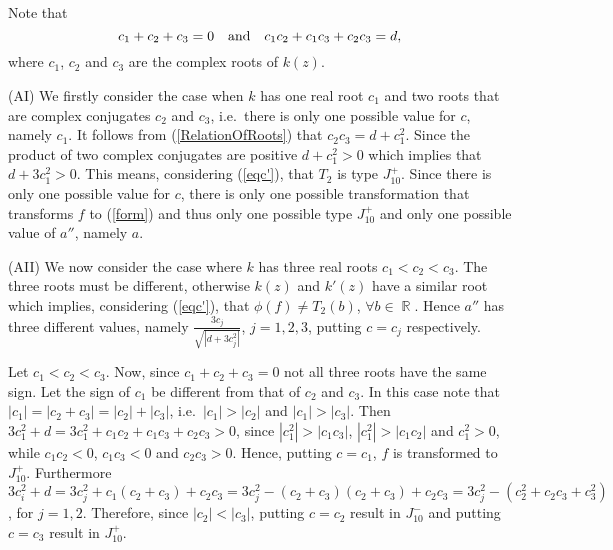 \documentclass[noend]{amsproc}
\theoremstyle{definition}
\DeclareMathOperator{\R}{\mathbb{R}}
\begin{document}
Note that
\begin{equation}\label{RelationOfRoots}
c_1+c_2+c_3=0\quad\textnormal{and}\quad c_1c_2+c_1c_3+c_2c_3=d,
\end{equation}
where $c_1$, $c_2$ and $c_3$ are the complex roots of $k(z)$.

(AI) We firstly consider the case when $k$ has one real root $c_1$ and two roots that are complex conjugates $c_2$ and $c_3$, i.e.~there is only one possible value for $c$, namely $c_1$. It follows from (\ref{RelationOfRoots}) that $c_2c_3=d+c_1^2$. Since the product of two complex conjugates are positive $d+c_1^2>0$ which implies that $d+3c_1^2>0$. This means, considering (\ref{eqc'}), that $T_2$ is type $J_{10}^+$. Since there is only one possible value for $c$, there is only one possible transformation that transforms $f$ to (\ref{form}) and thus only one possible type $J_{10}^+$ and only one possible value of $a''$, namely $a$.

(AII) We now consider the case where $k$ has three real roots $c_1<c_2<c_3$. The three roots must be different, otherwise $k(z)$ and $k'(z)$ have a similar root which implies, considering (\ref{eqc'}), that $\phi(f)\neq T_2(b)$, $\forall b\in\R$. Hence $a''$ has three different values, namely $\frac{3c_j}{\sqrt{|d+3c_j^2|}}$, $j=1,2,3$, putting $c=c_j$ respectively.

Let $c_1<c_2<c_3$. Now, since $c_1+c_2+c_3=0$ not all three roots have the same sign. Let the sign of $c_1$ be different from that of $c_2$ and $c_3$. In this case note that $|c_1|=|c_2+c_3|=|c_2|+|c_3|$, i.e.~$|c_1|>|c_2|$ and $|c_1|>|c_3|$. Then $3c_1^2+d=3c_1^2+c_1c_2+c_1c_3+c_2c_3>0$, since $|c_1^2|>|c_1c_3|$, $|c_1^2|>|c_1c_2|$ and $c_1^2>0$, while $c_1c_2<0$, $c_1c_3<0$ and $c_2c_3>0$. Hence, putting $c=c_1$, $f$ is transformed to $J_{10}^+$.
Furthermore $3c_i^2+d=3c_j^2+c_1(c_2+c_3)+c_2c_3=3c_j^2-(c_2+c_3)(c_2+c_3)+c_2c_3=3c_j^2-(c_2^2+c_2c_3+c_3^2)$, for $j=1,2$. Therefore, since $|c_2|<|c_3|$, putting $c=c_2$ result in $J_{10}^-$ and putting $c=c_3$ result in $J_{10}^+$.
\end{document}
